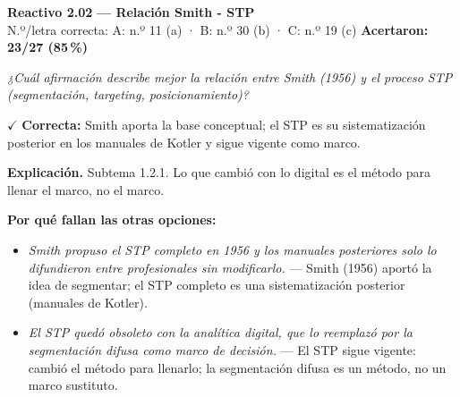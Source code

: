 \documentclass[10pt,letterpaper]{article}
\begin{document}
\begin{minipage}{\textwidth}
{\color{guinda}\textbf{Reactivo 2.02}} \textbf{— Relación Smith - STP}\\[-1pt]
{\scriptsize N.º/letra correcta: A: n.º 11 (a) · B: n.º 30 (b) · C: n.º 19 (c) \hfill \textbf{Acertaron: 23/27 (85\,\%)}}

\textit{¿Cuál afirmación describe mejor la relación entre Smith (1956) y el proceso STP (segmentación, \textit{targeting}, posicionamiento)?}

\textcolor{verde}{$\checkmark$} \textbf{Correcta:} Smith aporta la base conceptual; el STP es su sistematización posterior en los manuales de Kotler y sigue vigente como marco.

\textbf{Explicación.} Subtema 1.2.1. Lo que cambió con lo digital es el método para llenar el marco, no el marco.

\textbf{Por qué fallan las otras opciones:}
\begin{itemize}[itemsep=0pt,topsep=1pt,leftmargin=1.3em,parsep=0pt]
\item[\textcolor{rojo}{$\times$}] \textit{Smith propuso el STP completo en 1956 y los manuales posteriores solo lo difundieron entre profesionales sin modificarlo.} --- Smith (1956) aportó la idea de segmentar; el STP completo es una sistematización posterior (manuales de Kotler).
\item[\textcolor{rojo}{$\times$}] \textit{El STP quedó obsoleto con la analítica digital, que lo reemplazó por la segmentación difusa como marco de decisión.} --- El STP sigue vigente: cambió el método para llenarlo; la segmentación difusa es un método, no un marco sustituto.
\end{itemize}
\end{minipage}\par\vspace{5pt}{\color{gray!40}\hrule}\vspace{5pt}
\end{document}
